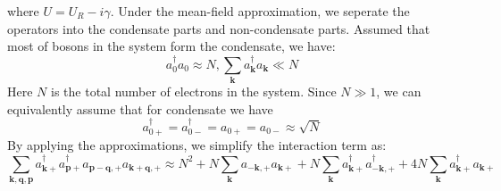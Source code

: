 \documentclass[aps,onecolumn,superscriptaddress,notitlepage,longbibliography]{revtex4-1}
\begin{document}
where $U = U_R - i \gamma$. Under the mean-field approximation, we seperate
the operators into the condensate parts and non-condensate parts. Assumed that
most of bosons in the system form the condensate, we have:
\begin{equation}
  a_0^{\dagger} a_0 \approx N, \sum_{\mathbf{k}} a_{\mathbf{k}}^{\dagger}
  a_{\mathbf{k}} \ll N
\end{equation}
Here $N$ is the total number of electrons in the system. Since $N \gg 1$, we
can equivalently assume that for condensate we have
\begin{equation}
  a_{0 +}^{\dagger} = a_{0 -}^{\dagger} = a_{0 +} = a_{0 -} \approx \sqrt{N}
\end{equation}
By applying the approximations, we simplify the interaction term as:
\begin{equation}
  \sum_{\mathbf{k}, \mathbf{q}, \mathbf{p}} a_{\mathbf{k}+}^{\dagger}
  a_{\mathbf{p}+}^{\dagger} a_{\mathbf{p}-\mathbf{q}, +}
  a_{\mathbf{k}+\mathbf{q}, +} \approx N^2 + N \sum_{\mathbf{k}}
  a_{-\mathbf{k}, +} a_{\mathbf{k}+} + N \sum_{\mathbf{k}}
  a_{\mathbf{k}+}^{\dagger} a_{-\mathbf{k}, +}^{\dagger} + 4 N
  \sum_{\mathbf{k}} a_{\mathbf{k}+}^{\dagger} a_{\mathbf{k}+}
  \label{mean1}
\end{equation}
\end{document}
